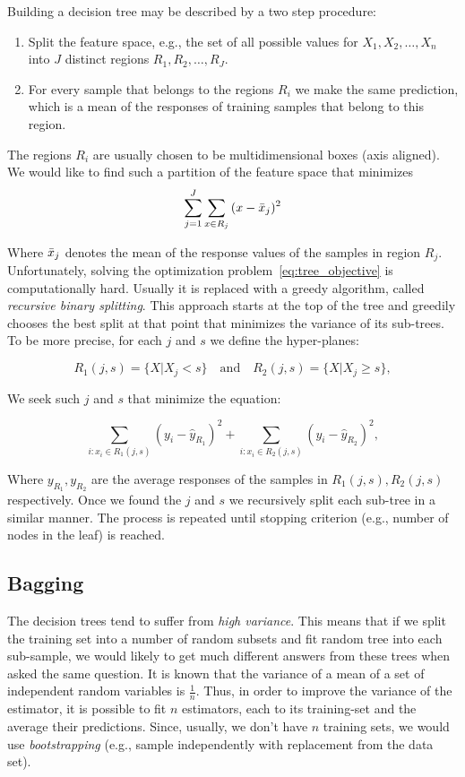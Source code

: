 Building a decision tree may be described by a two step procedure:
\begin{enumerate}
\item Split the feature space, e.g., the set of all possible values
  for $X_1, X_2,\ldots,X_n$ into $J$ distinct regions $R_1, R_2,\ldots, R_J$.
\item For every sample that belongs to the regions $R_i$ we make the
  same prediction, which is a mean of the responses of training
  samples that belong to this region.
\end{enumerate}

The regions $R_i$ are usually chosen to be multidimensional boxes (axis aligned).  We would like to find such a partition of the feature space that minimizes
\begin{equation}\label{eq:tree_objective}
\sum\limits_{j=1}^J\sum_{x\in R_j}{(x-\bar{x}_j)^2}
\end{equation}

Where $\bar{x}_j$ denotes the mean of the response values of the
samples in region $R_j$.  Unfortunately, solving the optimization
problem~\ref{eq:tree_objective} is computationally hard.  Usually it
is replaced with a greedy algorithm, called \textit{recursive binary
  splitting}.  This approach starts at the top of the tree and
greedily chooses the best split at that point that minimizes the
variance of its sub-trees.  To be more precise, for each $j$ and $s$ we
define the hyper-planes:

\begin{equation}
  R_1(j,s) = \{ X\lvert X_j<s \}\quad\text{and}\quad R_2(j,s) = \{ X\lvert X_j \geq s \},
\end{equation}

We seek such $j$ and $s$ that minimize the equation:

\begin{equation}
  \sum\limits_{i:x_i\in R_1(j,s)}{(y_i-\hat{y}_{R_1})}^2 + \sum\limits_{i:x_i\in R_2(j,s)}{(y_i-\hat{y}_{R_2})}^2,
\end{equation}

Where $y_{R_1}, y_{R_2}$ are the average responses of the samples in
$R_1(j,s), R_2(j,s)$ respectively.  Once we found the $j$ and $s$ we
recursively split each sub-tree in a similar manner.  The process is
repeated until stopping criterion (e.g., number of nodes in the leaf)
is reached.

\subsection{Bagging}
The decision trees tend to suffer from \textit{high variance}. This
means that if we split the training set into a number of random
subsets and fit random tree into each sub-sample, we would likely to
get much different answers from these trees when asked the same
question.  It is known that the variance of a mean of a set of
independent random variables is $\frac{1}{n}$.  Thus, in order to
improve the variance of the estimator, it is possible to fit $n$
estimators, each to its training-set and the average their
predictions.  Since, usually, we don't have $n$ training sets, we
would use \textit{bootstrapping} (e.g., sample independently with
replacement from the data set).

